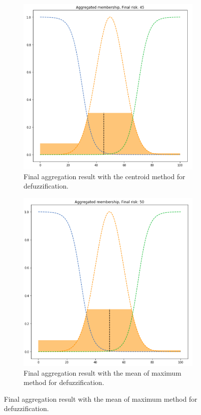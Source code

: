 \documentclass[conference]{IEEEtran}
\begin{document}
\begin{figure}[ht]
\begin{subfigure}{.5\textwidth}
  \centering
  \includegraphics[width=.8\linewidth]{figures/second/prod-centroid.png}  
  \caption{Final aggregation result with the centroid method for defuzzification.}
  \label{fig:2prod-centroid}
\end{subfigure}
\begin{subfigure}{.5\textwidth}
  \centering
  \includegraphics[width=.8\linewidth]{figures/second/prod-mom.png}  
  \caption{Final aggregation result with the mean of maximum method for defuzzification.}
  \label{fig:2prod-mom}
\end{subfigure}

\end{figure}
\end{document}
